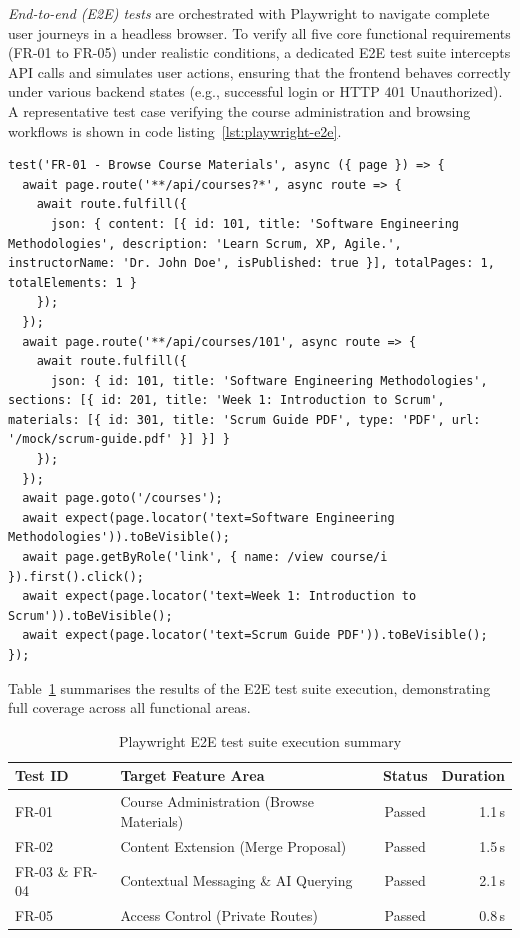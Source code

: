 \emph{End-to-end (E2E) tests} are orchestrated with Playwright to navigate complete user journeys in a headless browser. To verify all five core functional requirements (FR-01 to FR-05) under realistic conditions, a dedicated E2E test suite intercepts API calls and simulates user actions, ensuring that the frontend behaves correctly under various backend states (e.g., successful login or HTTP 401 Unauthorized).
A representative test case verifying the course administration and browsing workflows is shown in code listing~\ref{lst:playwright-e2e}.

\newpage
\begin{lstlisting}[caption={Playwright E2E test verifying course material browsing}, label={lst:playwright-e2e}]
test('FR-01 - Browse Course Materials', async ({ page }) => {
  await page.route('**/api/courses?*', async route => {
    await route.fulfill({
      json: { content: [{ id: 101, title: 'Software Engineering Methodologies', description: 'Learn Scrum, XP, Agile.', instructorName: 'Dr. John Doe', isPublished: true }], totalPages: 1, totalElements: 1 }
    });
  });
  await page.route('**/api/courses/101', async route => {
    await route.fulfill({
      json: { id: 101, title: 'Software Engineering Methodologies', sections: [{ id: 201, title: 'Week 1: Introduction to Scrum', materials: [{ id: 301, title: 'Scrum Guide PDF', type: 'PDF', url: '/mock/scrum-guide.pdf' }] }] }
    });
  });
  await page.goto('/courses');
  await expect(page.locator('text=Software Engineering Methodologies')).toBeVisible();
  await page.getByRole('link', { name: /view course/i }).first().click();
  await expect(page.locator('text=Week 1: Introduction to Scrum')).toBeVisible();
  await expect(page.locator('text=Scrum Guide PDF')).toBeVisible();
});
\end{lstlisting}

Table~\ref{tab:playwright-results} summarises the results of the E2E test suite execution, demonstrating full coverage across all functional areas.

\begin{table}[htbp]
\centering
\caption{Playwright E2E test suite execution summary}
\label{tab:playwright-results}
\begin{tabularx}{\textwidth}{l X c r}
\toprule
\textbf{Test ID} & \textbf{Target Feature Area} & \textbf{Status} & \textbf{Duration} \\
\midrule
FR-01 & Course Administration (Browse Materials) & Passed & 1.1\,s \\
FR-02 & Content Extension (Merge Proposal) & Passed & 1.5\,s \\
FR-03 \& FR-04 & Contextual Messaging \& AI Querying & Passed & 2.1\,s \\
FR-05 & Access Control (Private Routes) & Passed & 0.8\,s \\
\bottomrule
\end{tabularx}
\end{table}

